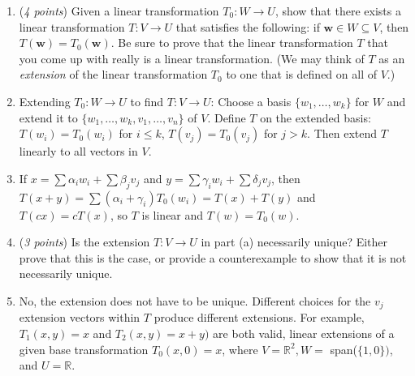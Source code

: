 \documentclass[11pt]{article}
\newcommand{\bbR}{\mathbb{R}}
\theoremstyle{definition}
\numberwithin{equation}{subsection}
\begin{document}
\begin{enumerate}
\begin{enumerate}

\item (\emph{4 points}) Given a linear transformation $T_0\colon W\to U$, show that there exists a linear transformation $T\colon V\to U$ that satisfies the following: if $\mathbf{w}\in W\subseteq V$, then $T(\mathbf{w})=T_0(\mathbf{w})$. Be sure to prove that the linear transformation $T$ that you come up with really is a linear transformation. (We may think of $T$ as an \emph{extension} of the linear transformation $T_0$ to one that is defined on all of $V$.)
\item[] Extending $T_0: W\to U$ to find $T:V\to U$: Choose a basis $\{w_1,\ldots, w_k\}$ for $W$ and extend it to $\{w_1,\dots,w_k,v_1,\dots,v_n\}$ of $V$. Define $T$ on the extended basis: $T(w_i)=T_0(w_i)$ for $i\leq k$, $T(v_j)=T_0(v_j)$ for $j>k$. Then extend $T$ linearly to all vectors in $V$.
\item[] If $x=\sum\alpha_iw_i+\sum\beta_jv_j$ and $y=\sum\gamma_iw_i+\sum\delta_jv_j$, then $T(x+y)=\sum(\alpha_i+\gamma_i)T_0(w_i)=T(x)+T(y)$ and $T(cx)=cT(x)$, so $T$ is linear and $T(w)=T_0(w)$.

\item (\emph{3 points}) Is the extension $T\colon V\to U$ in part (a) necessarily unique? Either prove that this is the case, or provide a counterexample to show that it is not necessarily unique. 
\item[] No, the extension does not have to be unique. Different choices for the $v_j$ extension vectors within $T$ produce different extensions. For example, $T_1(x,y)=x$ and $T_2(x,y)=x+y)$ are both valid, linear extensions of a given base transformation $T_0(x,0)=x$, where $V=\bbR^2, W=$ span($\{1,0\})$, and $U=\bbR$.

\end{enumerate}


\end{enumerate}
\end{document}

